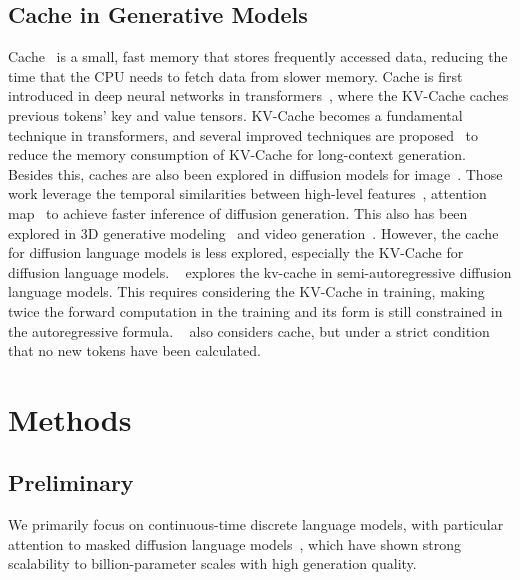\documentclass{article}
\begin{document}
\subsection{Cache in Generative Models}
Cache~\cite{wilkes2006slave} is a small, fast memory that stores frequently accessed data, reducing the time that the CPU needs to fetch data from slower memory. Cache is first introduced in deep neural networks in transformers~\cite{vaswani2017attention}, where the KV-Cache caches previous tokens' key and value tensors. KV-Cache becomes a fundamental technique in transformers, and several improved techniques are proposed~\cite{ge2024model,liu2023scissorhands,hooper2024kvquant} to reduce the memory consumption of KV-Cache for long-context generation. Besides this, caches are also been explored in diffusion models for image~\cite{ma2023deepcache,wimbauer2023cache}. Those work leverage the temporal similarities between high-level features~\cite{ma2024learning,chen2024delta}, attention map~\cite{yuan2024ditfastattn,liu2024faster} to achieve faster inference of diffusion generation. This also has been explored in 3D generative modeling~\cite{yang2024hash3d} and video generation~\cite{zhao2024real,lv2024fastercache}. However, the cache for diffusion language models is less explored, especially the KV-Cache for diffusion language models. ~\cite{arriola2025block} explores the kv-cache in semi-autoregressive diffusion language models. This requires considering the KV-Cache in training, making twice the forward computation in the training and its form is still constrained in the autoregressive formula. ~\cite{sahoo2024simple} also considers cache, but under a strict condition that no new tokens have been calculated.



\section{Methods}

\subsection{Preliminary}
We primarily focus on continuous-time discrete language models, with particular attention to masked diffusion language models~\cite{sahoo2024simple,nie2025llada}, which have shown strong scalability to billion-parameter scales with high generation quality.
\end{document}
